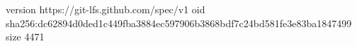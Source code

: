 version https://git-lfs.github.com/spec/v1
oid sha256:dc62894d0ded1c449fba3884ec597906b3868bdf7c24bd581fe3e83ba1847499
size 4471
